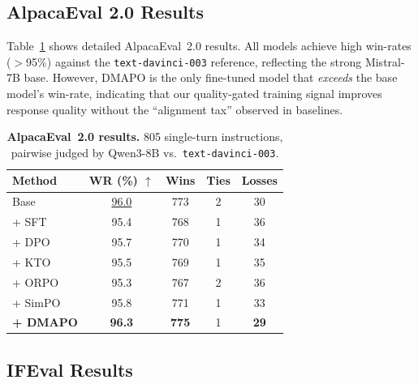\documentclass[10pt,twocolumn]{article}
\newcommand{\ours}{\textsc{DMAPO}}
\newcommand{\best}[1]{\textbf{#1}}
\newcommand{\second}[1]{\underline{#1}}
\newcommand{\up}{$\uparrow$}
\begin{document}

\subsection{AlpacaEval 2.0 Results}
\label{sec:alpaca_eval}

Table~\ref{tab:alpaca_eval} shows detailed AlpacaEval~2.0 results.
All models achieve high win-rates ($>$95\%) against the \texttt{text-davinci-003} reference, reflecting the strong Mistral-7B base.
However, \ours{} is the only fine-tuned model that \emph{exceeds} the base model's win-rate, indicating that our quality-gated training signal improves response quality without the ``alignment tax'' observed in baselines.

\begin{table}[t]
\centering
\caption{\textbf{AlpacaEval~2.0 results.}
805 single-turn instructions, pairwise judged by Qwen3-8B vs.\ \texttt{text-davinci-003}.}
\label{tab:alpaca_eval}
\vspace{0.5em}
\begin{tabular}{l cccc}
\toprule
\textbf{Method} & \textbf{WR (\%)} \up{} & \textbf{Wins} & \textbf{Ties} & \textbf{Losses} \\
\midrule
Base       & \second{96.0} & 773 & 2 & 30 \\
+ SFT      & 95.4 & 768 & 1 & 36 \\
+ DPO      & 95.7 & 770 & 1 & 34 \\
+ KTO      & 95.5 & 769 & 1 & 35 \\
+ ORPO     & 95.3 & 767 & 2 & 36 \\
+ SimPO    & 95.8 & 771 & 1 & 33 \\
\midrule
\textbf{+ \ours{}} & \best{96.3} & \best{775} & 1 & \best{29} \\
\bottomrule
\end{tabular}
\end{table}



\subsection{IFEval Results}
\label{sec:ifeval}
\end{document}
